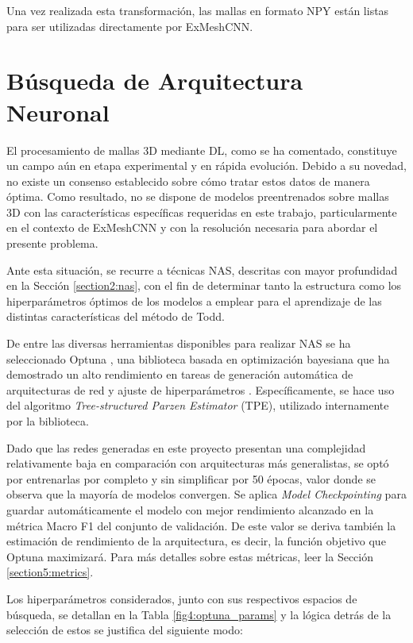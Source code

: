 Una vez realizada esta transformación, las mallas en formato NPY están listas para ser utilizadas directamente por ExMeshCNN.

\section{Búsqueda de Arquitectura Neuronal}
\label{section4:nas}
El procesamiento de mallas 3D mediante DL, como se ha comentado, constituye un campo aún en etapa experimental y en rápida evolución. Debido a su novedad, no existe un consenso establecido sobre cómo tratar estos datos de manera óptima. Como resultado, no se dispone de modelos preentrenados sobre mallas 3D con las características específicas requeridas en este trabajo, particularmente en el contexto de ExMeshCNN y con la resolución necesaria para abordar el presente problema.

Ante esta situación, se recurre a técnicas NAS, descritas con mayor profundidad en la Sección \ref{section2:nas}, con el fin de determinar tanto la estructura como los hiperparámetros óptimos de los modelos a emplear para el aprendizaje de las distintas características del método de Todd.

De entre las diversas herramientas disponibles para realizar NAS se ha seleccionado Optuna \cite{optuna_2019}, una biblioteca basada en optimización bayesiana que ha demostrado un alto rendimiento en tareas de generación automática de arquitecturas de red y ajuste de hiperparámetros \cite{pizurica_generic_2024}. Específicamente, se hace uso del algoritmo \textit{Tree-structured Parzen Estimator} (TPE), utilizado internamente por la biblioteca. 

Dado que las redes generadas en este proyecto presentan una complejidad relativamente baja en comparación con arquitecturas más generalistas, se optó por entrenarlas por completo y sin simplificar por 50 épocas, valor donde se observa que la mayoría de modelos convergen. Se aplica \textit{Model Checkpointing} para guardar automáticamente el modelo con mejor rendimiento alcanzado en la métrica Macro F1 del conjunto de validación. De este valor se deriva también la estimación de rendimiento de la arquitectura, es decir, la función objetivo que Optuna maximizará. Para más detalles sobre estas métricas, leer la Sección  \ref{section5:metrics}.

Los hiperparámetros considerados, junto con sus respectivos espacios de búsqueda, se detallan en la Tabla \ref{fig4:optuna_params} y la lógica detrás de la selección de estos se justifica del siguiente modo:

